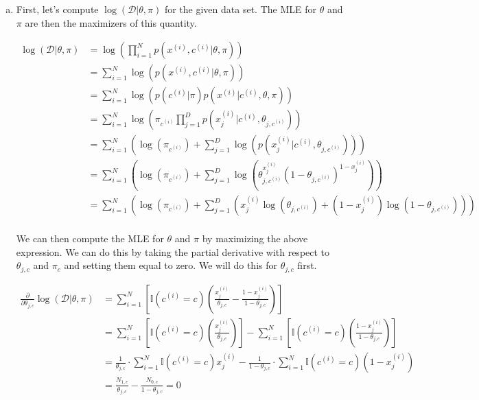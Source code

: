 \documentclass{article}
\begin{document}
\begin{enumerate}[(a)]
    \item First, let's compute $\log(\mathcal{D} | \theta, \pi)$ for the given data set. The MLE for $\theta$ and $\pi$ are then the maximizers of this quantity. 
    
    \begin{align*}
        \log(\mathcal{D} | \theta, \pi) &= \log\left(
            \prod_{i = 1}^N p(x^{(i)}, c^{(i)} | \theta, \pi)
        \right) \\
        &= \sum_{i = 1}^N \log\left(
            p(x^{(i)}, c^{(i)} | \theta, \pi)
        \right) \\
        &= \sum_{i = 1}^N \log\left(
            p(c^{(i)} | \pi) p(x^{(i)} | c^{(i)}, \theta, \pi)
        \right) \\
        &= \sum_{i = 1}^N \log\left(
            \pi_{c^{(i)}} \prod_{j = 1}^D p(x_j^{(i)} | c^{(i)}, \theta_{j, c^{(i)}})
        \right) \\
        &= \sum_{i = 1}^N \left( \log
            (\pi_{c^{(i)}}) + \sum_{j = 1}^D \log(p(x_j^{(i)} | c^{(i)}, \theta_{j, c^{(i)}}))
        \right) \\
        &= \sum_{i = 1}^N \left( \log
            (\pi_{c^{(i)}}) + \sum_{j = 1}^D \log\left(
                \theta_{j, c^{(i)}}^{x_j^{(i)}} (1 - \theta_{j, c^{(i)}})^{1 - x_j^{(i)}}
            \right)
        \right) \\
        &= \sum_{i = 1}^N \left( \log
            (\pi_{c^{(i)}}) + \sum_{j = 1}^D \left(
                x_j^{(i)} \log(\theta_{j, c^{(i)}}) + (1 - x_j^{(i)}) \log(1 - \theta_{j, c^{(i)}})
            \right)
        \right) \\
    \end{align*}

    We can then compute the MLE for $\theta$ and $\pi$ by maximizing the above expression. We can do this by taking the partial derivative with respect to $\theta_{j, c}$ and $\pi_c$ and setting them equal to zero. We will do this for $\theta_{j, c}$ first.

    \begin{align*}
        \frac{\partial}{\partial \theta_{j, c}} \log(\mathcal{D} | \theta, \pi) &= \sum_{i = 1}^N \left[ \mathbb{I}(c^{(i)} = c) \left(
            \frac{x_j^{(i)}}{\theta_{j, c}} - \frac{1 - x_j^{(i)}}{1 - \theta_{j, c}}
        \right) \right]\\
        &= \sum_{i = 1}^N \left[ \mathbb{I}(c^{(i)} = c) \left(
            \frac{x_j^{(i)}}{\theta_{j, c}}\right) \right]
            - \sum_{i = 1}^N \left[  \mathbb{I}(c^{(i)} = c) \left(\frac{1 - x_j^{(i)}}{1 - \theta_{j, c}}
        \right) \right]\\
        &= \frac{1}{\theta_{j, c}} \cdot \sum_{i = 1}^N  \mathbb{I}(c^{(i)} = c) x_j^{(i)}
            - \frac{1}{1 - \theta_{j, c}} \cdot \sum_{i = 1}^N  \mathbb{I}(c^{(i)} = c) (1 - x_j^{(i)}) \\
        &= \frac{N_{1, c}}{\theta_{j, c}} - \frac{N_{0, c}}{1 - \theta_{j, c}} = 0 \\
    \end{align*}


\end{enumerate}
\end{document}
